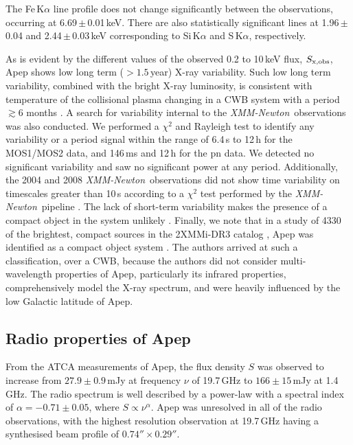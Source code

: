 \documentclass[preprint,times]{aastex61}
\newcommand{\xmm}{\emph{XMM-Newton}}
\begin{document}
The Fe\,K$\alpha$ line profile does not change significantly between the observations, occurring at 6.69\,$\pm$\,0.01\,keV. There are also statistically significant lines at 1.96\,$\pm$\,0.04 and 2.44\,$\pm$\,0.03\,keV corresponding to Si\,K$\alpha$ and S\,K$\alpha$, respectively.

As is evident by the different values of the observed 0.2 to 10\,keV flux, $S_{\rm{x},\rm{obs}}$, Apep shows low long term ($>1.5$\,year) X-ray variability. Such low long term variability, combined with the bright X-ray luminosity, is consistent with temperature of the collisional plasma changing in a CWB system with a period $\gtrsim 6$ months \citep{2011ApJ...727L..17Z}. A search for variability internal to the \xmm~observations was also conducted. We performed a $\chi^{2}$ and Rayleigh test\citep{Callingham2012} to identify any variability or a period signal within the range of 6.4\,s to 12\,h for the MOS1/MOS2 data, and 146\,ms and 12\,h for the pn data. We detected no significant variability and saw no significant power at any period. Additionally, the 2004 and 2008 \xmm~observations did not show time variability on timescales greater than 10\,s according to a $\chi^{2}$ test performed by the \xmm~pipeline \citep{Watson2009}. The lack of short-term variability makes the presence of a compact object in the system unlikely \citep{2011ApJ...727L..17Z}. Finally, we note that in a study of 4330 of the brightest, compact sources in the 2XMMi-DR3 catalog \cite{Watson2009}, Apep was identified as a compact object system \cite{2012ApJ...756...27L}. The authors arrived at such a classification, over a CWB, because the authors did not consider multi-wavelength properties of Apep, particularly its infrared properties, comprehensively model the X-ray spectrum, and were heavily influenced by the low Galactic latitude of Apep.

\subsection{Radio properties of Apep}

From the ATCA measurements of Apep, the flux density $S$ was observed to increase from $27.9 \pm 0.9$\,mJy at frequency $\nu$ of 19.7\,GHz to $166 \pm 15$\,mJy at 1.4\,GHz. The radio spectrum is well described by a power-law with a spectral index of $\alpha = -0.71 \pm 0.05$, where $S \propto \nu^{\alpha}$. Apep was unresolved in all of the radio observations, with the highest resolution observation at 19.7\,GHz having a synthesised beam profile of $0.74'' \times 0.29''$. 
\end{document}
